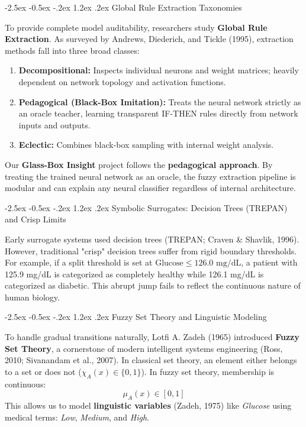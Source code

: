 \documentclass[12pt,a4paper,oneside]{report}
\makeatletter
\renewcommand\section{\@startsection {section}{1}{\z@}%
                                   {-2.5ex \@plus -0.5ex \@minus -.2ex}%
                                   {1.2ex \@plus .2ex}%
                                   {\normalfont\fontsize{13}{16}\selectfont\bfseries}}
\makeatother
\begin{document}
\section{Global Rule Extraction Taxonomies}

To provide complete model auditability, researchers study \textbf{Global Rule Extraction}. As surveyed by Andrews, Diederich, and Tickle (1995), extraction methods fall into three broad classes:
\begin{enumerate}
    \setlength{\itemsep}{0pt}
    \setlength{\parskip}{0pt}
    \item \textbf{Decompositional:} Inspects individual neurons and weight matrices; heavily dependent on network topology and activation functions.
    \item \textbf{Pedagogical (Black-Box Imitation):} Treats the neural network strictly as an oracle teacher, learning transparent IF-THEN rules directly from network inputs and outputs.
    \item \textbf{Eclectic:} Combines black-box sampling with internal weight analysis.
\end{enumerate}
Our \textbf{Glass-Box Insight} project follows the \textbf{pedagogical approach}. By treating the trained neural network as an oracle, the fuzzy extraction pipeline is modular and can explain any neural classifier regardless of internal architecture.

\section{Symbolic Surrogates: Decision Trees (TREPAN) and Crisp Limits}

Early surrogate systems used decision trees (TREPAN; Craven \& Shavlik, 1996). However, traditional "crisp" decision trees suffer from rigid boundary thresholds. For example, if a split threshold is set at $\text{Glucose} \le 126.0\text{ mg/dL}$, a patient with 125.9 mg/dL is categorized as completely healthy while 126.1 mg/dL is categorized as diabetic. This abrupt jump fails to reflect the continuous nature of human biology.

\section{Fuzzy Set Theory and Linguistic Modeling}

To handle gradual transitions naturally, Lotfi A. Zadeh (1965) introduced \textbf{Fuzzy Set Theory}, a cornerstone of modern intelligent systems engineering (Ross, 2010; Sivanandam et al., 2007). In classical set theory, an element either belongs to a set or does not ($\chi_A(x) \in \{0, 1\}$). In fuzzy set theory, membership is continuous:
\begin{equation}
    \mu_A(x) \in [0, 1]
\end{equation}
This allows us to model \textbf{linguistic variables} (Zadeh, 1975) like \textit{Glucose} using medical terms: \textit{Low}, \textit{Medium}, and \textit{High}.
\end{document}
